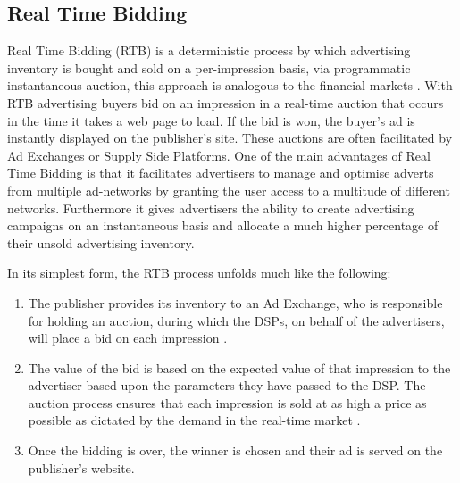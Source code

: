 \documentclass[12pt]{article}
\begin{document}
\subsection{ Real Time Bidding}
Real Time Bidding (RTB) is a deterministic process by which advertising inventory is bought and sold on a per-impression basis, via programmatic instantaneous auction, this approach is analogous to the financial markets \parencite{RTB}. With RTB advertising buyers bid on an impression in a real-time auction that occurs in the time it takes a web page to load. If the bid is won, the buyer's ad is instantly displayed on the publisher's site. These auctions are often facilitated by Ad Exchanges or Supply Side Platforms. One of the main advantages of Real Time Bidding is that it facilitates advertisers to manage and optimise adverts from multiple ad-networks by granting the user access to a multitude of different networks. Furthermore it gives advertisers the ability to create advertising campaigns on an instantaneous basis and allocate a much higher percentage of their unsold advertising inventory. \newline

In its simplest form, the RTB process unfolds much like the following: 
\begin{enumerate}
\item The publisher provides its inventory to an Ad Exchange, who is responsible for holding an auction, during which the DSPs, on behalf of the advertisers, will place a bid on each impression \parencite{howRTBWorks}. 
\item The value of the bid is based on the expected value of that impression to the advertiser based upon the parameters they have passed to the DSP. The auction process ensures that each impression is sold at as high a price as possible as dictated by the demand in the real-time market \parencite{howRTBWorks}. 
\item Once the bidding is over, the winner is chosen and their ad is served on the publisher's website. 
\end{enumerate}
\end{document}
